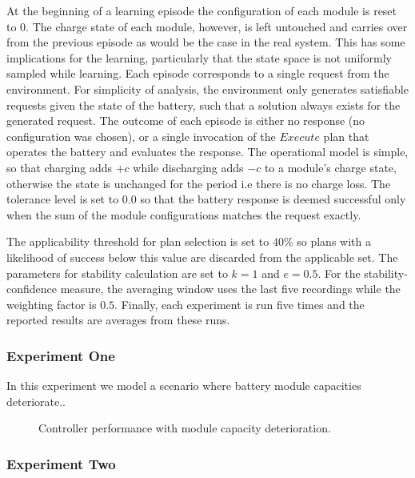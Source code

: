 At the beginning of a learning episode the configuration of each module is reset to $0$. The charge state of each module, however, is left untouched and carries over from the previous episode as would be the case in the real system. This has some implications for the learning, particularly that the state space is not uniformly sampled while learning. Each episode corresponds to a single request from the environment. For simplicity of analysis, the environment only generates satisfiable requests given the state of the battery, such that a solution always exists for the generated request. The outcome of each episode is either no response (no configuration was chosen), or a single invocation of the $Execute$ plan that operates the battery and evaluates the response. The operational model is simple, so that charging adds $+c$ while discharging adds $-c$ to a module's charge state, otherwise the state is unchanged for the period i.e there is no charge loss. The tolerance level is set to $0.0$ so that the battery response is deemed successful only when the sum of the module configurations matches the request exactly.

The applicability threshold for plan selection is set to $40\%$ so plans with a likelihood of success below this value are discarded from the applicable set. The parameters for stability calculation are set to $k=1$ and $e=0.5$. For the stability-confidence measure, the averaging window uses the last five recordings while the weighting factor is $0.5$. Finally, each experiment is run five times and the reported results are averages from these runs.

\subsubsection{Experiment One}

In this experiment we model a scenario where battery module capacities deteriorate..

\begin{figure}[ht]
\begin{center}

\end{center}
\caption{Controller performance with module capacity deterioration.}
\label{fig:experiment1}
\end{figure}

\subsubsection{Experiment Two}

